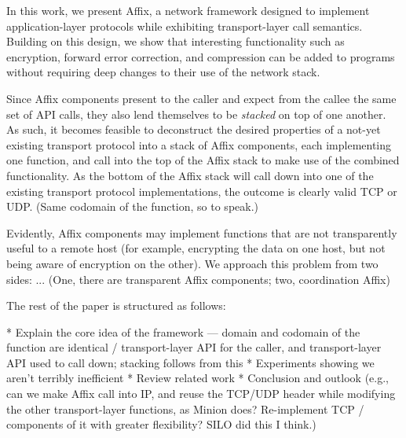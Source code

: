 In this work, we present Affix, a network framework designed to
implement application-layer protocols while exhibiting transport-layer
call semantics. Building on this design, we show that interesting
functionality such as encryption, forward error correction, and
compression can be added to programs without requiring deep changes
to their use of the network stack.

Since Affix components present to the caller and expect from the
callee the same set of \ac{API} calls, they also lend themselves
to be \textit{stacked} on top of one another. As such, it becomes
feasible to deconstruct the desired properties of a not-yet existing
transport protocol into a stack of Affix components, each implementing
one function, and call into the top of the Affix stack to make use
of the combined functionality. As the bottom of the Affix stack
will call down into one of the existing transport protocol
implementations, the outcome is clearly valid TCP or UDP. (Same
codomain of the function, so to speak.)

Evidently, Affix components may implement functions that are not
transparently useful to a remote host (for example, encrypting the
data on one host, but not being aware of encryption on the other).
We approach this problem from two sides: ... (One, there are
transparent Affix components; two, coordination Affix)

The rest of the paper is structured as follows:

* Explain the core idea of the framework --- domain and codomain
of the function are identical / transport-layer API for the caller,
and transport-layer API used to call down; stacking follows from
this * Experiments showing we aren't terribly inefficient * Review
related work * Conclusion and outlook (e.g., can we make Affix call
into IP, and reuse the TCP/UDP header while modifying the other
transport-layer functions, as Minion does? Re-implement TCP /
components of it with greater flexibility? SILO did this I think.)


